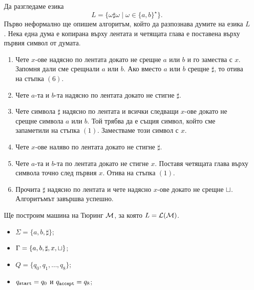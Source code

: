 \begin{example}
  Да разгледаме езика
  \[L = \{\omega \sharp \omega \mid \omega\in\{a,b\}^\star\}.\]
  Първо неформално ще опишем алгоритъм, който да разпознава думите на езика $L$.
  Нека една дума е копирана върху лентата и четящата глава е поставена върху първия символ от думата.
  \begin{enumerate}[(1)]
  \item
    Чете $x$-ове надясно по лентата докато не срещне $a$ или $b$ и го замества с $x$.
    Запомня дали сме срещнали $a$ или $b$.
    Ако вместо $a$ или $b$ срещне $\sharp$, то отива на стъпка $(6)$.
  \item
    Чете $a$-та и $b$-та надясно по лентата докато не стигне $\sharp$. 
  \item
    Чете символа $\sharp$ надясно по лентата и всички следващи $x$-ове докато не срещне символа $a$ или $b$.
    Той трябва да е същия символ, който сме запаметили на стъпка $(1)$.
    Заместваме този символ с $x$.
  \item
    Чете $x$-ове наляво по лентата докато не стигне $\sharp$.
  \item
    Чете $a$-та и $b$-та по лентата докато не стигне $x$.
    Поставя четящата глава върху символа точно след първия $x$.
    Отива на стъпка $(1)$.
  \item
    Прочита $\sharp$ надясно по лентата и чете надясно $x$-ове докато не срещне $\sqcup$.
    Алгоритъмът завършва успешно.
  \end{enumerate}
  Ще построим машина на Тюринг $\mathcal{M}$, за която $L = \mathcal{L}(\mathcal{M})$.
  \begin{itemize}
  \item 
    $\Sigma = \{a,b,\sharp\}$;
  \item
    $\Gamma = \{a,b,\sharp,x,\sqcup\}$;
  \item
    $Q = \{q_0,q_1,\dots,q_8\}$;
  \item
    $q_{\texttt{start}} = q_0$ и $q_{\texttt{accept}} = q_8$;
  \end{itemize}

  \begin{framed}
    \begin{figure}[H]
      \begin{center}
\end{center}
\end{figure}
\end{framed}
\end{example}
